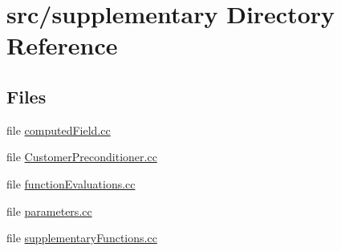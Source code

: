 \section{src/supplementary Directory Reference}
\label{dir_53133442c8337a88c60b6b4cdd6c1809}
\subsection*{Files}
\begin{DoxyCompactItemize}
\item 
file \hyperlink{computed_field_8cc}{computed\-Field.\-cc}
\item 
file \hyperlink{_customer_preconditioner_8cc}{Customer\-Preconditioner.\-cc}
\item 
file \hyperlink{function_evaluations_8cc}{function\-Evaluations.\-cc}
\item 
file \hyperlink{parameters_8cc}{parameters.\-cc}
\item 
file \hyperlink{supplementary_functions_8cc}{supplementary\-Functions.\-cc}
\end{DoxyCompactItemize}
